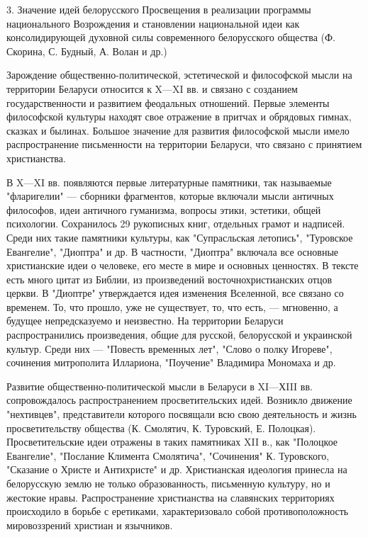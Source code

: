 3. Значение идей белорусского Просвещения в реализации программы национального Возрождения и становлении национальной идеи как консолидирующей духовной силы современного белорусского общества (Ф. Скорина, С. Будный, А. Волан и др.)



Зарождение общественно-политической, эстетической и философской мысли на территории Беларуси относится к X—XI вв. и связано с созданием государственности и развитием феодальных отношений. Первые элементы философской культуры находят свое отражение в притчах и обрядовых гимнах, сказках и былинах. Большое значение для развития философской мысли имело распространение письменности на территории Беларуси, что связано с принятием христианства.

В X—XI вв. появляются первые литературные памятники, так называемые "фларигелии" — сборники фрагментов, которые включали мысли античных философов, идеи античного гуманизма, вопросы этики, эстетики, общей психологии. Сохранилось 29 рукописных книг, отдельных грамот и надписей. Среди них такие памятники культуры, как "Супрасльская летопись", "Туровское Евангелие", "Диоптра" и др. В частности, "Диоптра" включала все основные христианские идеи о человеке, его месте в мире и основных ценностях. В тексте есть много цитат из Библии, из произведений восточнохристианских отцов церкви. В "Диоптре" утверждается идея изменения Вселенной, все связано со временем. То, что прошло, уже не существует, то, что есть, — мгновенно, а будущее непредсказуемо и неизвестно. На территории Беларуси распространились произведения, общие для русской, белорусской и украинской культур. Среди них — "Повесть временных лет", "Слово о полку Игореве", сочинения митрополита Иллариона, "Поучение" Владимира Мономаха и др.

Развитие общественно-политической мысли в Беларуси в XI—ХIII вв. сопровождалось распространением просветительских идей. Возникло движение "нехтивцев", представители которого посвящали всю свою деятельность и жизнь просветительству общества (К. Смолятич, К. Туровский, Е. Полоцкая). Просветительские идеи отражены в таких памятниках XII в., как "Полоцкое Евангелие", "Послание Климента Смолятича", "Сочинения" К. Туровского, "Сказание о Христе и Антихристе" и др. Христианская идеология принесла на белорусскую землю не только образованность, письменную культуру, но и жестокие нравы. Распространение христианства на славянских территориях происходило в борьбе с еретиками, характеризовало собой противоположность мировоззрений христиан и язычников.

